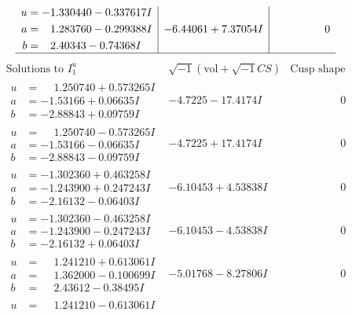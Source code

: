 \documentclass[1p]{elsarticle_modified}
\theoremstyle{definition}
\newcommand{\I}{\sqrt{-1}}
\begin{document}
$$\begin{array}{c|c|c}
\begin{aligned}
u &= -1.330440 - 0.337617 I \\
a &= \phantom{-}1.283760 - 0.299388 I \\
b &= \phantom{-}2.40343 - 0.74368 I\end{aligned}
 & -6.44061 + 7.37054 I & \phantom{-0.000000 } 0\\
 \hline 
 \end{array}$$\newpage$$\begin{array}{c|c|c}  
\text{Solutions to }I^u_{1}& \I (\text{vol} + \sqrt{-1}CS) & \text{Cusp shape}\\
 \hline 
\begin{aligned}
u &= \phantom{-}1.250740 + 0.573265 I \\
a &= -1.53166 + 0.06635 I \\
b &= -2.88843 + 0.09759 I\end{aligned}
 & -4.7225 - 17.4174 I & \phantom{-0.000000 } 0 \\ \hline\begin{aligned}
u &= \phantom{-}1.250740 - 0.573265 I \\
a &= -1.53166 - 0.06635 I \\
b &= -2.88843 - 0.09759 I\end{aligned}
 & -4.7225 + 17.4174 I & \phantom{-0.000000 } 0 \\ \hline\begin{aligned}
u &= -1.302360 + 0.463258 I \\
a &= -1.243900 + 0.247243 I \\
b &= -2.16132 - 0.06403 I\end{aligned}
 & -6.10453 + 4.53838 I & \phantom{-0.000000 } 0 \\ \hline\begin{aligned}
u &= -1.302360 - 0.463258 I \\
a &= -1.243900 - 0.247243 I \\
b &= -2.16132 + 0.06403 I\end{aligned}
 & -6.10453 - 4.53838 I & \phantom{-0.000000 } 0 \\ \hline\begin{aligned}
u &= \phantom{-}1.241210 + 0.613061 I \\
a &= \phantom{-}1.362000 - 0.100699 I \\
b &= \phantom{-}2.43612 - 0.38495 I\end{aligned}
 & -5.01768 - 8.27806 I & \phantom{-0.000000 } 0 \\ \hline\begin{aligned}
u &= \phantom{-}1.241210 - 0.613061 I \\

\end{aligned}
\end{array}$$
\end{document}
